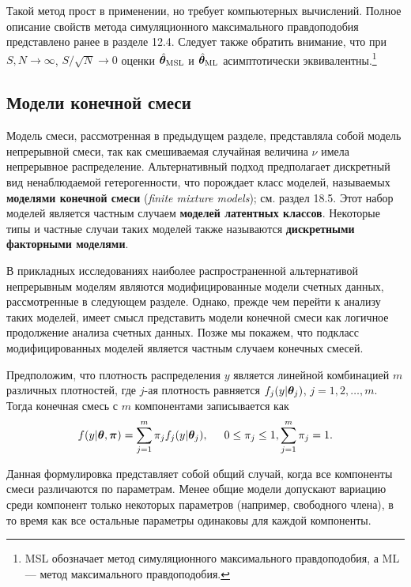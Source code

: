 Такой метод прост в применении, но требует компьютерных вычислений. Полное описание свойств метода симуляционного максимального правдоподобия представлено ранее в разделе 12.4. %
Следует также обратить внимание, что при $S, N \rightarrow \infty$, $S/\sqrt{N} \rightarrow 0$ оценки $\hat{\bm{\theta}}_{\mathrm{MSL}}$ и $\hat{\bm{\theta}}_{\mathrm{ML}}$ асимптотически эквивалентны.\footnote{MSL обозначает метод симуляционного максимального правдоподобия, а ML --- метод максимального правдоподобия.}


\subsection{Модели конечной смеси}\label{sec:20.4.3}

\noindent
Модель смеси, рассмотренная в предыдущем разделе, представляла собой модель непрерывной смеси, так как смешиваемая случайная величина $\nu$ имела непрерывное распределение. Альтернативный подход предполагает дискретный вид ненаблюдаемой гетерогенности, что порождает класс моделей, называемых \textbf{моделями конечной смеси} (\textit{finite mixture models}); см. раздел 18.5. Этот набор моделей  является частным случаем \textbf{моделей латентных классов}. 
Некоторые типы и частные случаи таких моделей также называются \textbf{дискретными факторными моделями}.

В прикладных исследованиях наиболее распространенной альтернативой непрерывным моделям являются модифицированные модели счетных данных, рассмотренные в следующем разделе. Однако, прежде чем перейти к анализу таких моделей, имеет смысл представить модели конечной смеси как логичное продолжение анализа счетных данных. Позже мы покажем, что подкласс модифицированных моделей является частным случаем конечных смесей.

Предположим, что плотность распределения $y$ является линейной комбинацией $m$ различных плотностей, где $j$-ая плотность равняется $f_j(y|\bm{\theta}_j)$, $j = 1, 2, \ldots , m$. Тогда конечная смесь с $m$ компонентами записывается как
    \begin{align}\label{eq:20.15}
    f(y|\bm{\theta}, \bm{\pi}) = \sum^{m}_{j = 1} \pi_j f_j (y|\bm{\theta}_j), \hspace{0.5cm} 0 \le \pi_j \le 1, \sum^{m}_{j = 1} \pi_j = 1.
    \end{align}

Данная формулировка представляет собой общий случай, когда все компоненты смеси различаются по параметрам. Менее общие модели допускают вариацию среди компонент только некоторых параметров (например, свободного члена), в то время как все остальные параметры одинаковы для каждой компоненты.

